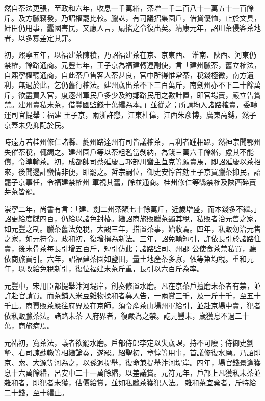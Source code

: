 \begin{pinyinscope}
 然自茶法更張，至政和六年，收息一千萬緡，茶增一千二百八十一萬五十一百餘斤。及方臘竊發，乃詔權罷比較。臘誅，有司議招集園戶，借貸優恤，止於文具，奸臣仍用事，蠹國害民，又慮人言，扇搖之令復出矣。靖康元年，詔川茶侵客茶地者，以多寡差定其罪。



 初，熙寧五年，以福建茶陳積，乃詔福建茶在京、京東西、
 淮南、陜西、河東仍禁榷，餘路通商。元豐七年，王子京為福建轉運副使，言「建州臘茶，舊立榷法，自熙寧權聽通商，自此茶戶售客人茶甚良，官中所得惟常茶，稅錢極微，南方遺利，無過於此，乞仍舊行榷法。建州歲出茶不下三百萬斤，南劍州亦不下二十餘萬斤，欲盡買入官，度逐州軍民戶多少及約鄰路民用之數計置，即官場賣，嚴立告賞禁。建州賣私末茶，借豐國監錢十萬緡為本。」並從之；所請均入諸路榷賣，委轉運司官提舉：福建
 王子京，兩浙許懋，江東杜偉，江西朱彥博，廣東高鎛，然子京蓋未免抑配於民。



 時遠方若桂州修仁諸縣、夔州路達州有司皆議榷茶，言利者踵相躡，然神宗聞鄂州失催茶稅，輒蠲之。建州園戶等以茶粗濫當剝納，為錢三萬六千餘緡，慮其不能償，令準輸茶。初，成都帥司蔡延慶言邛部川蠻主苴克等願賣馬，即詔延慶以茶招來，後聞邊計蠻情非便，即罷之。哲宗嗣位，御史安惇首劾王子京買臘茶抑民，詔罷子京事任，令福建禁榷州
 軍視其舊，餘並通商。桂州修仁等縣禁榷及陜西碎賣芽茶皆罷。



 崇寧二年，尚書有言：「建、劍二州茶額七十餘萬斤，近歲增盛，而本錢多不繼。」詔更給度牒四百，仍給以諸色封樁。繼詔商旅販臘茶蠲其稅，私販者治元售之家，如元豐之制。臘茶舊法免稅，大觀三年，措置茶事，始收焉。四年，私販勿治元售之家，如元符令。政和初，復增損為新法。三年，詔免輸短引，許依長引於諸路住賣，後末骨茶每長引增五百斤，短引仿此；諸路監司、州郡
 公使食茶禁私買，聽依商旅買引。六年，詔福建茶園如鹽田，量土地產茶多寡，依等第均稅。重和元年，以改給免稅新引，復位福建末茶斤重，長引以六百斤為率。



 元豐中，宋用臣都提舉汴河堤岸，創奏修置水磨。凡在京茶戶擅磨末茶者有禁，並許赴官請買。而茶鋪入米豆雜物揉和者募人告，一兩賞三千，及一斤十千，至五十千止。商賈販茶應往府界及在京師，須令產茶山場州軍給引，並赴京場中賣，犯者依私販臘茶法。諸路末茶
 入府界者，復嚴為之禁。訖元豐末，歲獲息不過二十萬，商旅病焉。



 元祐初，寬茶法，議者欲罷水磨。戶部侍郎李定以失歲課，持不可廢；侍御史劉摯、右司諫蘇轍等相繼論奏，遂罷。紹聖初，章惇等用事，首議修復水磨。乃詔即京、索、大源等河為之，以孫迥提舉，復命兼提舉汴河堤岸。四年，場官錢景逢獲息十六萬餘緡，呂安中二十一萬餘緡，以差議賞。元符元年，戶部上凡獲私末茶並雜和者，即犯者未獲，估價給賞，並如私臘茶獲犯人法。
 雜和茶宜棄者，斤特給二十錢，至十緡止。




\end{pinyinscope}
